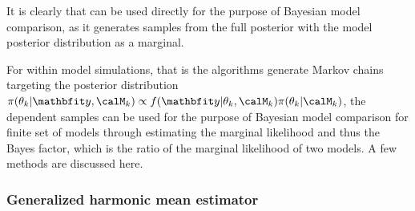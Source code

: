 It is clearly that \rjmcmc can be used directly for the purpose of Bayesian
model comparison, as it generates samples from the full posterior with the
model posterior distribution as a marginal.

For within model simulations, that is the algorithms generate Markov chains
targeting the posterior distribution $\pi(\theta_k|\data,\calM_k) \propto
f(\data|\theta_k,\calM_k)\pi(\theta_k|\calM_k)$, the dependent samples can be
used for the purpose of Bayesian model comparison for finite set of models
through estimating the marginal likelihood and thus the Bayes factor, which is
the ratio of the marginal likelihood of two models. A few methods are
discussed here.

\subsubsection{Generalized harmonic mean estimator}
\label{ssub:Generalized harmonic mean estimator}

